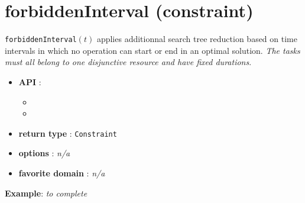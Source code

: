 \section{forbiddenInterval (constraint)}\label{forbiddeninterval:forbiddenintervalconstraint}\hypertarget{forbiddeninterval:forbiddenintervalconstraint}{}
\begin{notedef}
  \texttt{forbiddenInterval}$(t)$ applies additionnal search tree reduction based on time intervals in which no operation can start or end in an optimal solution. \emph{The tasks must all belong to one disjunctive resource and have fixed durations}.
\end{notedef}

\begin{itemize}
	\item \textbf{API} :
	\begin{itemize}
		\item {}
		\item {}
	\end{itemize}
	\item \textbf{return type} : \texttt{Constraint}
	\item \textbf{options} : \emph{n/a}
	\item \textbf{favorite domain} : \emph{n/a}
\end{itemize}

\textbf{Example}:
\emph{to complete}
%

